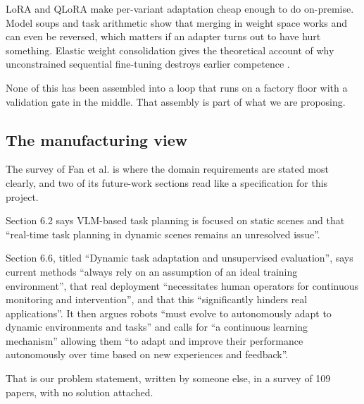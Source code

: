 \documentclass[conference]{IEEEtran}
\begin{document}
LoRA \cite{lora} and QLoRA \cite{qlora} make per-variant adaptation cheap
enough to do on-premise. Model soups \cite{soups} and task arithmetic
\cite{taskarith} show that merging in weight space works and can even be
reversed, which matters if an adapter turns out to have hurt something.
Elastic weight consolidation gives the theoretical account of why
unconstrained sequential fine-tuning destroys earlier competence
\cite{ewc}.

None of this has been assembled into a loop that runs on a factory floor
with a validation gate in the middle. That assembly is part of what we
are proposing.

\subsection{The manufacturing view}

The survey of Fan et al. \cite{fansurvey} is where the domain
requirements are stated most clearly, and two of its future-work sections
read like a specification for this project.

Section 6.2 says VLM-based task planning is focused on static scenes and
that ``real-time task planning in dynamic scenes remains an unresolved
issue''.

Section 6.6, titled ``Dynamic task adaptation and unsupervised
evaluation'', says current methods ``always rely on an assumption of an
ideal training environment'', that real deployment ``necessitates human
operators for continuous monitoring and intervention'', and that this
``significantly hinders real applications''. It then argues robots ``must
evolve to autonomously adapt to dynamic environments and tasks'' and
calls for ``a continuous learning mechanism'' allowing them ``to adapt
and improve their performance autonomously over time based on new
experiences and feedback''.

That is our problem statement, written by someone else, in a survey of
109 papers, with no solution attached.
\end{document}

